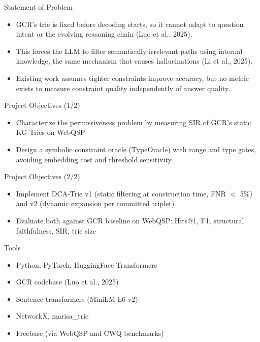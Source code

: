 \documentclass{beamer}
\begin{document}
\begin{frame}{Statement of Problem}
    \begin{itemize}
        \item GCR's trie is fixed before decoding starts, so it cannot adapt to question intent or the evolving reasoning chain (Luo et al., 2025).
        \vspace{0.3cm}
        \item This forces the LLM to filter semantically irrelevant paths using internal knowledge, the same mechanism that causes hallucinations (Li et al., 2025).
        \vspace{0.3cm}
        \item Existing work assumes tighter constraints improve accuracy, but no metric exists to measure constraint quality independently of answer quality.
    \end{itemize}
\end{frame}

\begin{frame}{Project Objectives (1/2)}
    \begin{itemize}
        \item Characterize the permissiveness problem by measuring SIR of GCR's static KG-Tries on WebQSP
        \vspace{0.3cm}
        \item Design a symbolic constraint oracle (TypeOracle) with range and type gates, avoiding embedding cost and threshold sensitivity
    \end{itemize}
\end{frame}

\begin{frame}{Project Objectives (2/2)}
    \begin{itemize}
        \item Implement DCA-Trie v1 (static filtering at construction time, FNR $<$ 5\%) and v2 (dynamic expansion per committed triplet)
        \vspace{0.3cm}
        \item Evaluate both against GCR baseline on WebQSP: Hits@1, F1, structural faithfulness, SIR, trie size
    \end{itemize}
\end{frame}

\begin{frame}{Tools}
    \begin{itemize}
        \item Python, PyTorch, HuggingFace Transformers
        \vspace{0.3cm}
        \item GCR codebase (Luo et al., 2025)
        \vspace{0.3cm}
        \item Sentence-transformers (MiniLM-L6-v2)
        \vspace{0.3cm}
        \item NetworkX, marisa\_trie
        \vspace{0.3cm}
        \item Freebase (via WebQSP and CWQ benchmarks)
    \end{itemize}
\end{frame}
\end{document}
